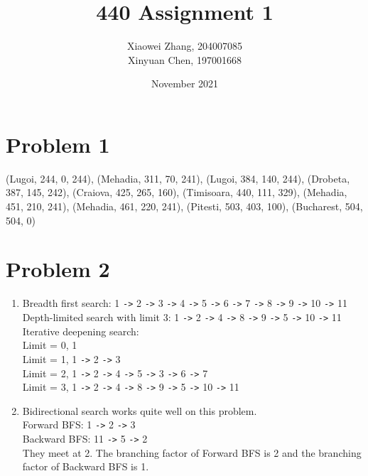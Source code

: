 \documentclass{article}
\title{440 Assignment 1}
\author{Xiaowei Zhang, 204007085 \\ Xinyuan Chen, 197001668}
\date{November 2021}
\begin{document}
\maketitle

\section*{Problem 1}
(Lugoi, 244, 0, 244), (Mehadia, 311, 70, 241), (Lugoi, 384, 140, 244), (Drobeta, 387, 145, 242), (Craiova, 425, 265, 160), (Timisoara, 440, 111, 329), (Mehadia, 451, 210, 241), (Mehadia, 461, 220, 241), (Pitesti, 503, 403, 100), (Bucharest, 504, 504, 0)

\section*{Problem 2}
\begin{enumerate}[label=(\alph*)]

\item
Breadth first search: 1 \verb|->| 2 \verb|->| 3 \verb|->| 4 \verb|->| 5 \verb|->| 6 \verb|->| 7 \verb|->| 8 \verb|->| 9 \verb|->| 10 \verb|->| 11\\
Depth-limited search with limit 3: 1 \verb|->| 2 \verb|->| 4 \verb|->| 8 \verb|->| 9 \verb|->| 5 \verb|->| 10 \verb|->| 11\\
Iterative deepening search:\\
Limit = 0, 1\\
Limit = 1, 1 \verb|->| 2 \verb|->| 3\\
Limit = 2, 1 \verb|->| 2 \verb|->| 4 \verb|->| 5 \verb|->| 3 \verb|->| 6 \verb|->| 7\\
Limit = 3, 1 \verb|->| 2 \verb|->| 4 \verb|->| 8 \verb|->| 9 \verb|->| 5 \verb|->| 10 \verb|->| 11\\

\item
Bidirectional search works quite well on this problem.\\
Forward BFS: 1 \verb|->| 2 \verb|->| 3\\
Backward BFS: 11 \verb|->| 5 \verb|->| 2\\
They meet at 2. The branching factor of Forward BFS is 2 and the branching factor of Backward BFS is 1.


\end{enumerate}
\end{document}
